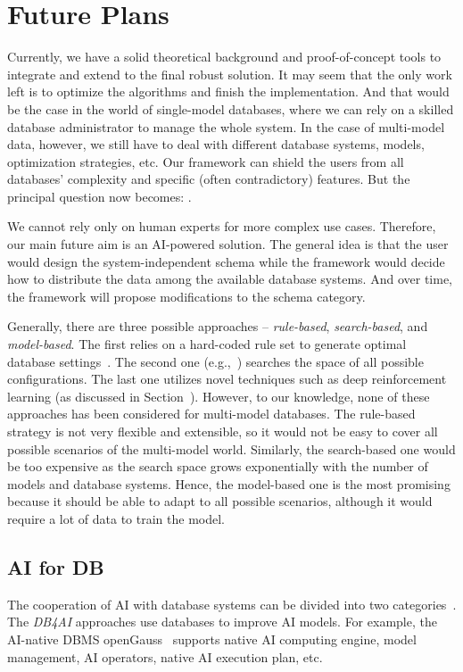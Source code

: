 \section{Future Plans}
Currently, we have a solid theoretical background and proof-of-concept tools to integrate and extend to the final robust solution. It may seem that the only work left is to optimize the algorithms and finish the implementation. And that would be the case in the world of single-model databases, where we can rely on a skilled database administrator to manage the whole system. In the case of multi-model data, however, we still have to deal with different database systems, models, optimization strategies, etc. Our framework can shield the users from all databases' complexity and specific (often contradictory) features. But the principal question now becomes: .

We cannot rely only on human experts for more complex use cases. Therefore, our main future aim is an AI-powered solution. The general idea is that the user would design the system-indepen\-dent schema while the framework would decide how to distribute the data among the available database systems. And over time, the framework will propose modifications to the schema category.

Generally, there are three possible approaches -- \emph{rule-based}, \emph{search-based}, and \emph{model-based}. The first relies on a hard-coded rule set to generate optimal database settings~\citep{Pavlo-blog}. The second one (e.g.,~\citep{DBLP:conf/cloud/ZhuLGBMLSY17}) searches the space of all possible configurations. The last one utilizes novel techniques such as deep reinforcement learning (as discussed in Section~).
However, to our knowledge, none of these approaches has been considered for multi-model databases. The rule-based strategy is not very flexible and extensible, so it would not be easy to cover all possible scenarios of the multi-model world. Similarly, the search-based one would be too expensive as the search space grows exponentially with the number of models and database systems. Hence, the model-based one is the most promising because it should be able to adapt to all possible scenarios, although it would require a lot of data to train the model.

\subsection{AI for DB}
The cooperation of AI with database systems can be divided into two categories~\citep{AI4DB}. The \emph{DB4AI} approaches use databases to improve AI models. For example, the AI-native DBMS openGauss~\citep{DBLP:journals/pvldb/0001ZSYHJLWL21} supports native AI computing engine, model management, AI operators, native AI execution plan, etc.

